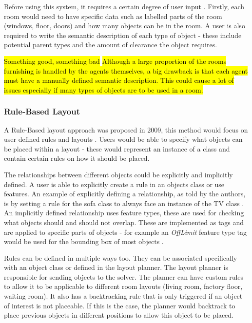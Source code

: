 Before using this system, it requires a certain degree of user input \cite{real-time-walkthroughs}. Firstly, each room would need to have specific data such as labelled parts of the room (windows, floor, doors) and how many objects can be in the room.
A user is also required to write the semantic description of each type of object - these include potential parent types and the amount of clearance the object requires.

\hl{Something good, something bad}
\hl{Although a large proportion of the rooms furnishing is handled by the agents themselves, a big drawback is that each agent must have a manually defined semantic description. This could cause a lot of issues especially if many types of objects are to be used in a room.}

\bigskip
\subsubsection{Rule-Based Layout}
A Rule-Based layout approach was proposed in 2009, this method would focus on user defined rules and layouts \cite{rule-based-layout}. Users would be able to specify what objects can be placed within a layout - these would represent an instance of a class and contain certain rules on how it should be placed.

The relationships between different objects could be explicitly and implicitly defined. A user is able to explicitly create a rule in an objects class or use features. An example of explicitly defining a relationship, as told by the authors, is by setting a rule for the sofa class to always face an instance of the TV class \cite{rule-based-layout}. An implicitly defined relationship uses feature types, these are used for checking what objects should and should not overlap. These are implemented as tags and are applied to specific parts of objects - for example an \textit{OffLimit} feature type tag would be used for the bounding box of most objects \cite{rule-based-layout}.

Rules can be defined in multiple ways too. They can be associated specifically with an object class or defined in the layout planner. %
The layout planner is responsible for sending objects to the solver. The planner can have custom rules to allow it to be applicable to different room layouts (living room, factory floor, waiting room). It also has a backtracking rule that is only triggered if an object of interest is not placeable. If this is the case, the planner would backtrack to place previous objects in different positions to allow this object to be placed.


